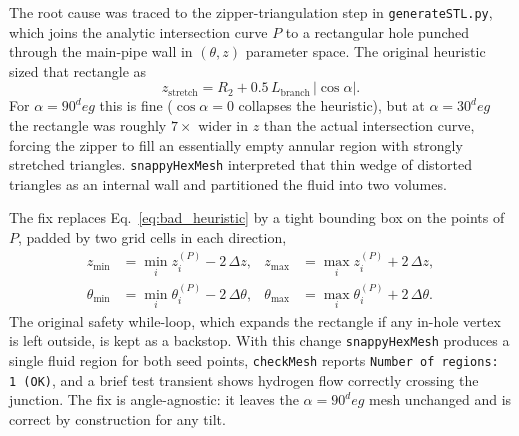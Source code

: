 \documentclass[11pt,a4paper]{article}
\def\circ{ deg}%
\begin{document}
The root cause was traced to the zipper-triangulation step in
\texttt{generateSTL.py}, which joins the analytic intersection
curve \(P\) to a rectangular hole punched through the main-pipe
wall in \((\theta, z)\) parameter space. The original heuristic
sized that rectangle as
\begin{equation}
z_{\mathrm{stretch}} = R_2 + 0.5\,L_{\mathrm{branch}}\,|\cos\alpha|.
\label{eq:bad_heuristic}
\end{equation}
For \(\alpha=90^\circ\) this is fine (\(\cos\alpha = 0\) collapses
the heuristic), but at \(\alpha=30^\circ\) the rectangle was
roughly \(7\times\) wider in \(z\) than the actual intersection
curve, forcing the zipper to fill an essentially empty annular
region with strongly stretched triangles.
\texttt{snappyHexMesh} interpreted that thin wedge of distorted
triangles as an internal wall and partitioned the fluid into two
volumes.

The fix replaces Eq.~\ref{eq:bad_heuristic} by a tight bounding box
on the points of \(P\), padded by two grid cells in each direction,
\begin{align}
z_{\min} &= \min_i z_i^{(P)} - 2\,\Delta z, &
z_{\max} &= \max_i z_i^{(P)} + 2\,\Delta z, \\
\theta_{\min} &= \min_i \theta_i^{(P)} - 2\,\Delta\theta, &
\theta_{\max} &= \max_i \theta_i^{(P)} + 2\,\Delta\theta.
\nonumber
\end{align}
The original safety while-loop, which expands the rectangle if any
in-hole vertex is left outside, is kept as a backstop. With this
change \texttt{snappyHexMesh} produces a single fluid region for
both seed points, \texttt{checkMesh} reports
\texttt{Number of regions: 1 (OK)}, and a brief test transient
shows hydrogen flow correctly crossing the junction. The fix is
angle-agnostic: it leaves the \(\alpha=90^\circ\) mesh unchanged
and is correct by construction for any tilt.
\end{document}
